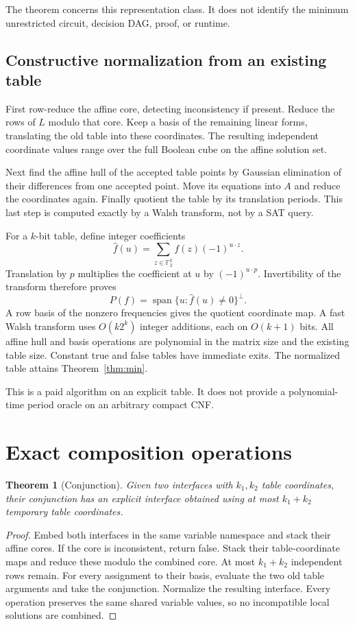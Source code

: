 \documentclass[11pt]{article}
\newtheorem{theorem}{Theorem}
\newcommand{\F}{\mathbb F_2}
\begin{document}
The theorem concerns this representation class. It does not identify the minimum
unrestricted circuit, decision DAG, proof, or runtime.

\subsection{Constructive normalization from an existing table}
First row-reduce the affine core, detecting inconsistency if present. Reduce the
rows of $L$ modulo that core. Keep a basis of the remaining linear forms, translating
the old table into these coordinates. The resulting independent coordinate values
range over the full Boolean cube on the affine solution set.

Next find the affine hull of the accepted table points by Gaussian elimination of
their differences from one accepted point. Move its equations into $A$ and reduce
the coordinates again. Finally quotient the table by its translation periods.
This last step is computed exactly by a Walsh transform, not by a SAT query.

For a $k$-bit table, define integer coefficients
\[
 \widehat f(u)=\sum_{z\in\F^k} f(z)(-1)^{u\cdot z}.
\]
Translation by $p$ multiplies the coefficient at $u$ by $(-1)^{u\cdot p}$.
Invertibility of the transform therefore proves
\begin{equation}\label{eq:walsh}
 P(f)=\operatorname{span}\{u:\widehat f(u)\ne0\}^{\perp}.
\end{equation}
A row basis of the nonzero frequencies gives the quotient coordinate map. A fast
Walsh transform uses $O(k2^k)$ integer additions, each on $O(k+1)$ bits. All affine
hull and basis operations are polynomial in the matrix size and the existing table
size. Constant true and false tables have immediate exits. The normalized table
attains Theorem~\ref{thm:min}.

This is a paid algorithm on an explicit table. It does not provide a polynomial-time
period oracle on an arbitrary compact CNF.

\section{Exact composition operations}
\begin{theorem}[Conjunction]\label{thm:join}
Given two interfaces with $k_1,k_2$ table coordinates, their conjunction has an
explicit interface obtained using at most $k_1+k_2$ temporary table coordinates.
\end{theorem}
\begin{proof}
Embed both interfaces in the same variable namespace and stack their affine cores.
If the core is inconsistent, return false. Stack their table-coordinate maps and
reduce these modulo the combined core. At most $k_1+k_2$ independent rows remain.
For every assignment to their basis, evaluate the two old table arguments and take
the conjunction. Normalize the resulting interface. Every operation preserves
the same shared variable values, so no incompatible local solutions are combined.
\end{proof}
\end{document}
